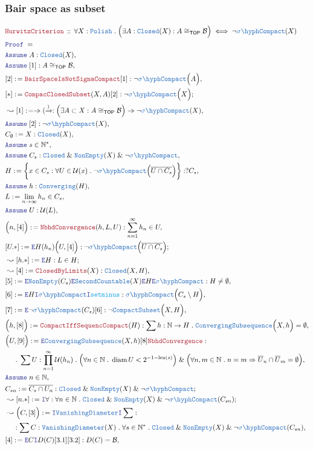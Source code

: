 \documentclass[12pt]{scrartcl}
\newcommand{\TYPE}[1]{\textcolor{NavyBlue}{\mathtt{#1}}}
\newcommand{\FUNC}[1]{\textcolor{Cerulean}{\mathtt{#1}}}
\newcommand{\LOGIC}[1]{\textcolor{Blue}{\mathtt{#1}}}
\newcommand{\THM}[1]{\textcolor{Maroon}{\mathtt{#1}}}
\renewcommand{\.}{\; . \;}
\newcommand{\de}{: \kern 0.1pc =}
\newcommand{\Theorem}[2]{& \THM{#1} \, :: \, #2 \\ & \Proof = \\ }
\newcommand{\NewLine}{\\ & \kern 1pc}
\newcommand{\Page}[1]{ \begin{align*} #1 \end{align*}   }
\renewcommand{\And}{\; \& \;}
\newcommand{\Imply}{\Rightarrow}
\newcommand{\Intro}{\LOGIC{I}}
\newcommand{\Elim}{\LOGIC{E}}
\newcommand{\Nat}{\mathbb{N} }
\newcommand{\Arrow}{\xrightarrow}
\newcommand{\Say}[3]{& #1 \de #2 : #3, \\}
\newcommand{\SayIn}[3]{& #1 \de #2 \in #3, \\}
\newcommand{\Conclude}[3]{& #1 \de #2 : #3; \\}
\newcommand{\Derive}[3]{& \leadsto #1 \de #2 : #3, \\}
\newcommand{\DeriveConclude}[3]{& \leadsto #1 \de #2 : #3 ; \\}
\newcommand{\Assume}[2]{& \LOGIC{Assume} \; #1 : #2, \\}
\newcommand{\AssumeIn}[2]{& \LOGIC{Assume} \; #1 \in #2, \\}
\newcommand{\Proof}{\LOGIC{Proof} \; }
\newcommand{\NonEmpty}{\TYPE{NonEmpty}}
\newcommand{\B}{\mathcal{B}}
\newcommand{\Compacts}{\TYPE{CompactSubset}}
\newcommand{\SCompact}{\TYPE{\sigma\hyph Compact}}
\newcommand{\Closed}{\TYPE{Closed}}
\newcommand{\TOP}{\mathsf{TOP}}
\newcommand{\U}{\mathcal{U}}
\DeclareMathOperator{\diam}{diam}
\newcommand{\FS}[1]{{#1}{}^*}
\newcommand{\Polish}{\TYPE{Polish}}
\DeclareMathOperator{\len}{len}
\begin{document}
\subsubsection{Bair space as subset}
\Page{
	\Theorem{HurwitzCriterion}
	{
		\forall X : \Polish \.
		\Big(
			\exists A : \Closed(X) : 
			A \cong_\TOP \B
		\Big)
		\iff
		\neg \SCompact(X)
	}
	\Assume{A}{\Closed(X)}
	\Assume{[1]}{A \cong_\TOP \B}
	\Say{[2]}{\THM{BairSpaceIsNotSigmaCompact}[1]}
	{
		\neg \SCompact\Big( A \Big)
	}
	\Conclude{[*]}{\THM{CompacClosedSubset}(X,A)[2]}{\neg \SCompact\Big( X \Big)}
	\Derive{[1]}{\Imply(\Arrow)}
	{
		\Big(
			\exists A \subset X : 
			A \cong_\TOP \B
		\Big)
		\Imply
		\neg \SCompact(X)	
	}
	\Assume{[2]}{\neg\SCompact(X)}
	\Say{C_\emptyset}{X}{\TYPE{Closed}(X)}
	\AssumeIn{s}{\FS{\Nat}}
	\Assume{C_s}{\Closed \And \NonEmpty(X) \And \neg \SCompact}
	\Say{H}{ \bigg\{ x \in C_s : \forall U \in \U(x) \. \neg \SCompact\Big(\overline{U \cap C_s} \Big)   \bigg\}   }
	{
		?C_s
	}
	\Assume{h}{\TYPE{Converging}(H)}
	\SayIn{L}{\lim_{n \to \infty} h_n}{C_s}
	\Assume{U}{\U(L)}
	\Say{\Big(n,[4]\Big)}{\THM{NbhdConvergence}(h,L,U)}{\sum^\infty_{n=1} h_n \in U}
	\Conclude{[U.*]}{\Elim H (h_n)\Big(U,[4]\Big)}{\neg \SCompact\Big( \overline{U \cap C_s} \Big)}
	\DeriveConclude{[h.*]}{\Elim H}{L \in H}
	\Derive{[4]}{\THM{ClosedByLimits}(X)}{\Closed(X,H)}
	\Say{[5]}{\Elim \TYPE{NonEmpty}(C_s) \Elim \TYPE{SecondCountable}(X) \Elim H \Elim \SCompact}
	{
		H \neq \emptyset
	}
	\Say{[6]}{\Elim H \Intro \SCompact \Intro \FUNC{setminus}}
	{
		\SCompact\Big( C_s \setminus H \Big)
	}
	\Say{[7]}{\Elim \neg\SCompact(C_s)[6]}{\neg \Compacts\Big(X,H\Big)}
	\Say{\Big( h ,[8] \Big)}{\THM{CompactIffSequencCompact}(H)}
	{
		\sum h : \Nat \to H \. \TYPE{ConvergingSubsequence}\Big(X,h\Big) = \emptyset
	}
	\Say{\Big(U,[9]\Big)}
	{
		\Elim \TYPE{ConvergingSubsequence}(X,h)[8] 
		\THM{NbhdConvergence}
	}
	{
		\NewLine \. 
		\sum U : \prod^\infty_{n=1} \U(h_n) \.
		\Big(
			\forall n \in \Nat \.
			\diam U < 2^{-1-\len(s)} 
		\Big)
		\And
		\Big(
			\forall n,m \in \Nat \.
			n = m 
			\Imply
			\overline{U}_n \cap \overline{U}_m = \emptyset
		\Big)
	}
	\AssumeIn{n}{\Nat}
	\Conclude{C_{sn}}{\overline{C_s \cap U_n}}{\Closed \And \NonEmpty(X) \And \neg \SCompact}
	\DeriveConclude{[n.*]}{\Intro \forall }{ \forall n \in \Nat \. \Closed \And \NonEmpty(X) \And \neg \SCompact(C_{sn})}
	\Derive{\Big(C,[3]\Big)}{\Intro \TYPE{VanishingDiameter} \Intro \sum}
	{
		\NewLine : 
		\sum C : \TYPE{VanishingDiameter}(X) \.
		\forall s \in \FS{\Nat} \. 
		\Closed \And \NonEmpty(X) \And \neg \SCompact(C_{sn})
	}
	\Say{[4]}{\Elim C \Intro D(C) [3.1][3.2] }{D(C) = \B}
}
\end{document}

